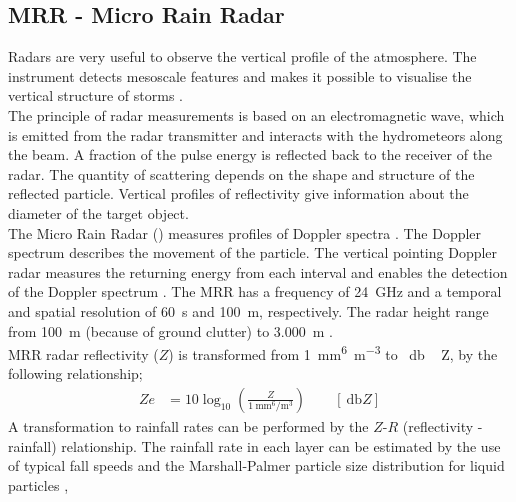 \subsection{MRR - Micro Rain Radar}\label{sec:MRR}

Radars are very useful to observe the vertical profile of the atmosphere. The instrument detects mesoscale features and makes it possible to visualise the vertical structure of storms \citep{markowski_mesoscale_2011}.\\
The principle of radar measurements is based on an electromagnetic wave, which is emitted from the radar transmitter and interacts with the hydrometeors along the beam. A fraction of the pulse energy is reflected back to the receiver of the radar. The quantity of scattering depends on the shape and structure of the reflected particle. 
Vertical profiles of reflectivity give information about the diameter of the target object.
\\
The Micro Rain Radar () measures profiles of Doppler spectra \citep{metek_micro_2010}. The Doppler spectrum describes the movement of the particle. The vertical pointing Doppler radar measures the returning energy from each interval and enables the detection of the Doppler spectrum \citep{lecuyer_aos_2017}. The MRR has a frequency of \SI{24}{\giga\Hz} and a temporal and spatial resolution of \SI{60}{\second} and \SI{100}{\metre}, respectively. The radar height range from \SI{100}{\metre} (because of ground clutter) to \SI{3.000}{\metre} \citep{metek_micro_2010}.
\\
MRR radar reflectivity ($Z$) is transformed from \SI{1}{\mm^6\per\metre^3} to \SI{}{\decibel\,Z}, by the following relationship;
\begin{align}
	Ze & = 10 \log_{10} \left(\frac{Z}{\SI{1}{\mm^6\per\metre^3}}\right) \qquad [\SI{}{\decibel Z}]
	\label{eq:Ze}
\end{align}
A transformation to rainfall rates can be performed by the $Z$-$R$ (reflectivity - rainfall) relationship. 
The rainfall rate in each layer can be estimated by the use of typical fall speeds and the Marshall-Palmer particle size distribution for liquid particles \citep{rinehart_radar_2010},  
